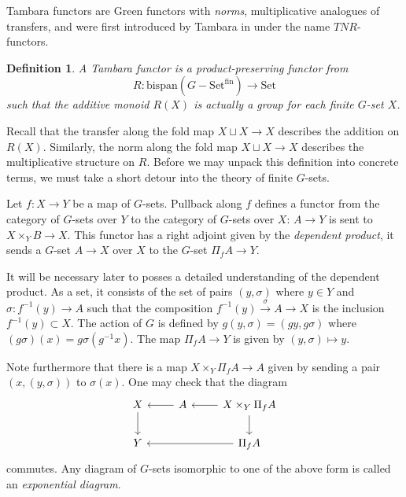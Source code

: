 \documentclass[11pt,dvipsnames]{amsart}
\theoremstyle{BoldRemark}
\newtheorem{definition}[theorem]{Definition}
\newcommand{\Set}{\mathrm{Set}}
\begin{document}
Tambara functors are Green functors with \emph{norms}, multiplicative analogues of transfers, and were first introduced by Tambara in \cite{Tam93} under the name $TNR$-functors.

\begin{definition}
	A Tambara functor is a product-preserving functor from 
    \[ 
        R : \mathrm{bispan}(G-\Set^{\mathrm{fin}}) \rightarrow \Set 
    \] 
    such that the additive monoid $R(X)$ is actually a group for each finite $G$-set $X$.
\end{definition}

Recall that the transfer along the fold map $X \sqcup X \rightarrow X$ describes the addition on $R(X)$. Similarly, the norm along the fold map $X \sqcup X \rightarrow X$ describes the multiplicative structure on $R$. Before we may unpack this definition into concrete terms, we must take a short detour into the theory of finite $G$-sets.

Let $f : X \rightarrow Y$ be a map of $G$-sets. Pullback along $f$ defines a functor from the category of $G$-sets over $Y$ to the category of $G$-sets over $X$: $A \rightarrow Y$ is sent to $X \times_Y B \rightarrow X$. This functor has a right adjoint given by the \emph{dependent product}, it sends a $G$-set $A \rightarrow X$ over $X$ to the $G$-set $\Pi_f A \rightarrow Y$. 

It will be necessary later to posses a detailed understanding of the dependent product. As a set, it consists of the set of pairs $(y,\sigma)$ where $y \in Y$ and $\sigma : f^{-1}(y) \rightarrow A$ such that the composition $f^{-1}(y) \xrightarrow{\sigma} A \rightarrow X$ is the inclusion $f^{-1}(y) \subset X$. The action of $G$ is defined by $g(y,\sigma) = (gy,g\sigma)$ where $(g \sigma)(x) = g \sigma( g^{-1} x)$. The map $\Pi_f A \rightarrow Y$ is given by $(y,\sigma) \mapsto y$.

Note furthermore that there is a map $X \times_Y \Pi_f A \rightarrow A$ given by sending a pair $(x,(y,\sigma))$ to $\sigma(x)$. One may check that the diagram
\[ \begin{tikzcd}
	X \arrow[d] & A \arrow[l] & X \times_Y \Pi_f A \arrow[l] \arrow[d] \\
	Y & & \Pi_f A \arrow[ll]
\end{tikzcd} \] 
commutes. Any diagram of $G$-sets isomorphic to one of the above form is called an \emph{exponential diagram}.
\end{document}
